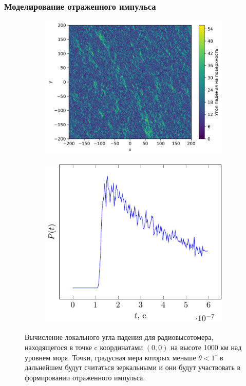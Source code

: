 \documentclass[10pt,pdf,hyperref={unicode}, dvipsnames]{beamer}
\begin{document}
\begin{frame}[t]
	\frametitle{Моделирование отраженного импульса}
    \begin{figure}[h]
        \begin{subfigure}{0.60\linewidth}
            \centering
            \includegraphics[width=\linewidth]{img/theta0}
        \end{subfigure}
        \begin{subfigure}{0.39\linewidth}
            \centering
            \includegraphics[width=\linewidth]{fig/theta}
        \end{subfigure}
        \caption*{Вычисление локального угла падения
            для радиовысотомера, находящегося в
            точке c координатами $(0,0)$ на высоте 1000 км над уровнем
            моря.  Точки, градусная мера которых меньше $\theta<1^\circ$ в
            дальнейшем будут считаться зеркальными и они будут участвовать в
            формировании отраженного импульса.}
    \end{figure}
\end{frame}
\end{document}
